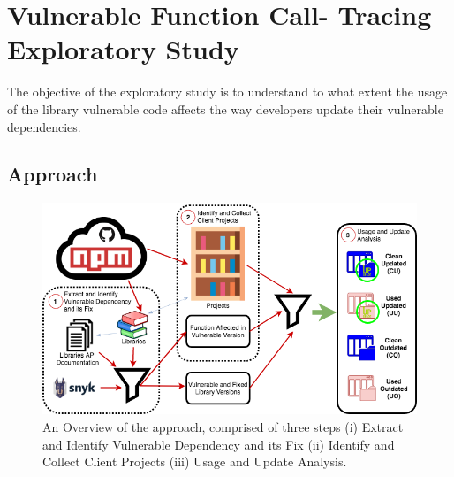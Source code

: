 \chapter{Vulnerable Function Call- Tracing Exploratory Study}
\label{sec:exploratory_study}

The objective of the exploratory study is to understand to what extent the usage of the library vulnerable code affects the way developers update their vulnerable dependencies.

\section{Approach}
\begin{figure}[ht]
\centering
\includegraphics[width=1\textwidth]{images/exploratory_approach.png}
\caption{An Overview of the approach, comprised of three steps (i) Extract and Identify Vulnerable Dependency and its Fix (ii) Identify and Collect Client Projects (iii) Usage and Update Analysis.}
\label{fig:example}
\end{figure}

